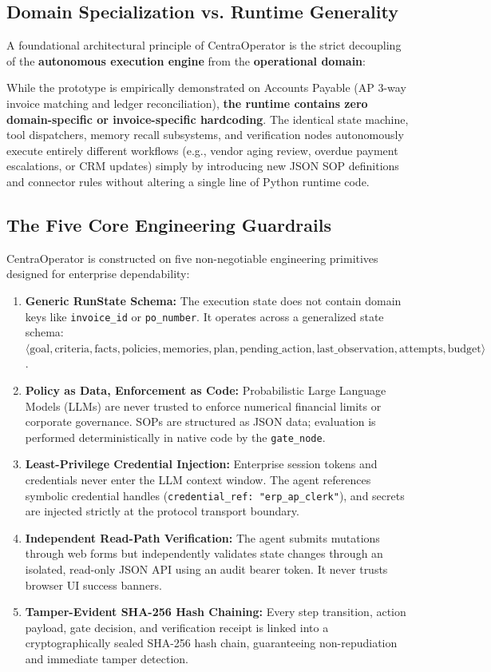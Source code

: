 \subsection{Domain Specialization vs. Runtime Generality}
A foundational architectural principle of CentraOperator is the strict decoupling of the \textbf{autonomous execution engine} from the \textbf{operational domain}:

\begin{insightbox}
While the prototype is empirically demonstrated on Accounts Payable (AP 3-way invoice matching and ledger reconciliation), \textbf{the runtime contains zero domain-specific or invoice-specific hardcoding}. The identical state machine, tool dispatchers, memory recall subsystems, and verification nodes autonomously execute entirely different workflows (e.g., vendor aging review, overdue payment escalations, or CRM updates) simply by introducing new JSON SOP definitions and connector rules without altering a single line of Python runtime code.
\end{insightbox}

\subsection{The Five Core Engineering Guardrails}
CentraOperator is constructed on five non-negotiable engineering primitives designed for enterprise dependability:

\begin{enumerate}[leftmargin=*]
  \item \textbf{Generic RunState Schema:} The execution state does not contain domain keys like \texttt{invoice\_id} or \texttt{po\_number}. It operates across a generalized state schema: $\langle \text{goal}, \text{criteria}, \text{facts}, \text{policies}, \text{memories}, \text{plan}, \text{pending\_action}, \text{last\_observation}, \text{attempts}, \text{budget} \rangle$.
  \item \textbf{Policy as Data, Enforcement as Code:} Probabilistic Large Language Models (LLMs) are never trusted to enforce numerical financial limits or corporate governance. SOPs are structured as JSON data; evaluation is performed deterministically in native code by the \texttt{gate\_node}.
  \item \textbf{Least-Privilege Credential Injection:} Enterprise session tokens and credentials never enter the LLM context window. The agent references symbolic credential handles (\texttt{credential\_ref: "erp\_ap\_clerk"}), and secrets are injected strictly at the protocol transport boundary.
  \item \textbf{Independent Read-Path Verification:} The agent submits mutations through web forms but independently validates state changes through an isolated, read-only JSON API using an audit bearer token. It never trusts browser UI success banners.
  \item \textbf{Tamper-Evident SHA-256 Hash Chaining:} Every step transition, action payload, gate decision, and verification receipt is linked into a cryptographically sealed SHA-256 hash chain, guaranteeing non-repudiation and immediate tamper detection.
\end{enumerate}
